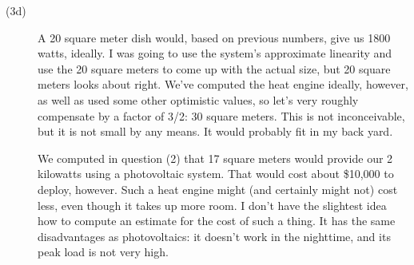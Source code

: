 \documentclass[12pt]{article}
\begin{document}
\begin{description}
\item[(3d)] A 20 square meter dish would, based on previous numbers,
give us 1800 watts, ideally.  I was going to use the system's
approximate linearity and use the 20 square meters to come up with the
actual size, but 20 square meters looks about right.  We've computed the
heat engine ideally, however, as well as used some other optimistic
values, so let's very roughly compensate by a factor of 3/2: 30 square
meters.  This is not inconceivable, but it is not small by any means.
It would probably fit in my back yard.  

We computed in question (2) that 17 square meters would provide our 2
kilowatts using a photovoltaic system.  That would cost about \$10,000
to deploy, however.  Such a heat engine might (and certainly might not)
cost less, even though it takes up more room.  I don't have the
slightest idea how to compute an estimate for the cost of such a thing.
It has the same disadvantages as photovoltaics: it doesn't work in the
nighttime, and its peak load is not very high. 

\end{description}
\end{document}
